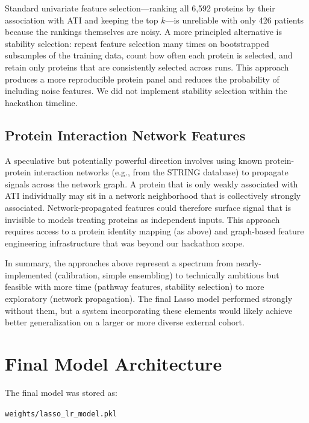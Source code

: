 \documentclass[11pt]{article}
\begin{document}
Standard univariate feature selection---ranking all 6,592 proteins by their association with ATI and keeping the top $k$---is unreliable with only 426 patients because the rankings themselves are noisy. A more principled alternative is stability selection: repeat feature selection many times on bootstrapped subsamples of the training data, count how often each protein is selected, and retain only proteins that are consistently selected across runs. This approach produces a more reproducible protein panel and reduces the probability of including noise features. We did not implement stability selection within the hackathon timeline.


\subsection*{Protein Interaction Network Features}

A speculative but potentially powerful direction involves using known protein-protein interaction networks (e.g., from the STRING database) to propagate signals across the network graph. A protein that is only weakly associated with ATI individually may sit in a network neighborhood that is collectively strongly associated. Network-propagated features could therefore surface signal that is invisible to models treating proteins as independent inputs. This approach requires access to a protein identity mapping (as above) and graph-based feature engineering infrastructure that was beyond our hackathon scope.


\vspace{0.2cm}

In summary, the approaches above represent a spectrum from nearly-implemented (calibration, simple ensembling) to technically ambitious but feasible with more time (pathway features, stability selection) to more exploratory (network propagation). The final Lasso model performed strongly without them, but a system incorporating these elements would likely achieve better generalization on a larger or more diverse external cohort.

\section{Final Model Architecture}

The final model was stored as:

\begin{center}
\texttt{weights/lasso\_lr\_model.pkl}
\end{center}
\end{document}
